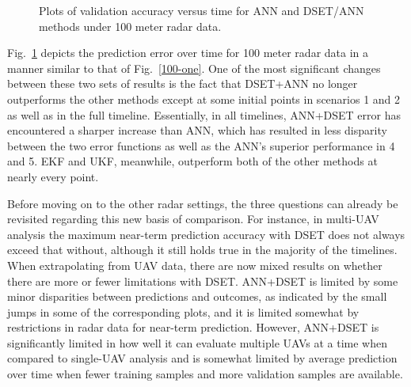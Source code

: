 \documentclass[12pt]{uthesis-v12}  %
\begin{document}
\begin{figure}
	\hfill	
{}
						
\caption{Plots of validation accuracy versus time for ANN and DSET/ANN methods under 100 meter radar data.}
	\label{100-multi}
	\end{figure}
	
Fig.~\ref{100-multi} depicts the prediction error over time for 100 meter radar data in a manner similar to that of Fig.~\ref{100-one}. One of the most significant changes between these two sets of results is the fact that DSET+ANN no longer outperforms the other methods except at some initial points in scenarios 1 and 2 as well as in the full timeline. Essentially, in all timelines, ANN+DSET error has encountered a sharper increase than ANN, which has resulted in less disparity between the two error functions as well as the ANN's superior performance in 4 and 5. EKF and UKF, meanwhile, outperform both of the other methods at nearly every point.

Before moving on to the other radar settings, the three questions can already be revisited regarding this new basis of comparison. For instance, in multi-UAV analysis the maximum near-term prediction accuracy with DSET does not always exceed that without, although it still holds true in the majority of the timelines. When extrapolating from UAV data, there are now mixed results on whether there are more or fewer limitations with DSET. ANN+DSET is limited by some minor disparities between predictions and outcomes, as indicated by the small jumps in some of the corresponding plots, and it is limited somewhat by restrictions in radar data for near-term prediction. However, ANN+DSET is significantly limited in how well it can evaluate multiple UAVs at a time when compared to single-UAV analysis and is somewhat limited by average prediction over time when fewer training samples and more validation samples are available.
	
\end{document}
